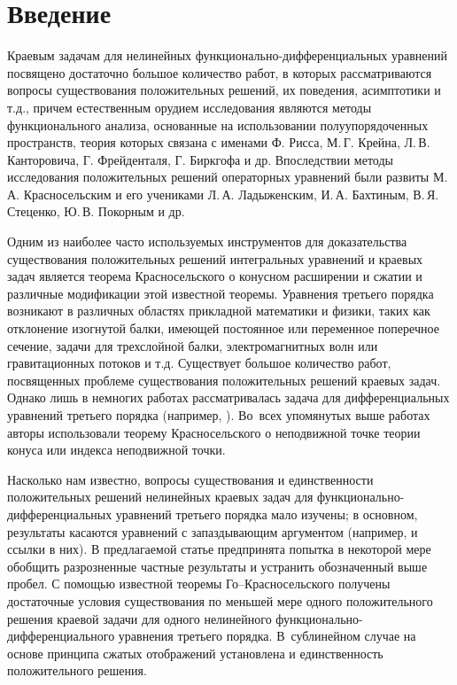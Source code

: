 \documentclass[press]{vestnik}
\begin{document}


\date{26-03-2024}

\maketitle

\section*{Введение}

Краевым задачам для нелинейных функционально-дифференциальных уравнений посвящено достаточно большое количество работ, в которых рассматриваются вопросы существования положительных решений, их поведения, асимптотики и т.д., причем естественным орудием исследования являются методы функционального анализа, основанные на использовании полуупорядоченных пространств, теория которых связана с именами Ф. Рисса, М.\,Г. Крейна, Л.\,В. Канторовича, Г. Фрейденталя, Г. Биркгофа и др. Впоследствии методы исследования положительных решений  операторных уравнений были развиты М.\,А. Красносельским и его учениками Л.\,А. Ладыженским, И.\,А. Бахтиным, В.\,Я. Стеценко, Ю.\,В. Покорным и др.

Одним из наиболее часто используемых инструментов для доказательства существования положительных решений интегральных уравнений и краевых задач является теорема Красносельского о конусном расширении и сжатии и различные модификации этой известной теоремы. Уравнения третьего порядка возникают в различных областях прикладной математики и физики, таких как отклонение изогнутой балки, имеющей постоянное или переменное поперечное сечение, задачи для трехслойной балки, электромагнитных волн или гравитационных потоков и т.д. Существует большое количество работ, посвященных проблеме существования положительных решений краевых задач. Однако лишь в немногих работах рассматривалась задача для дифференциальных уравнений третьего порядка (например, \cite{1,2,3,4,5,6,7,8}). Во~всех упомянутых выше работах авторы использовали теорему Красносельского о неподвижной точке теории конуса или индекса неподвижной точки.

Насколько нам известно, вопросы существования и единственности положительных решений нелинейных краевых задач для функционально-дифференциальных уравнений третьего порядка мало изучены; в основном, результаты касаются уравнений с запаздывающим аргументом (например, \cite{9,10} и ссылки в них). В предлагаемой статье предпринята попытка в некоторой мере обобщить разрозненные частные результаты и устранить обозначенный выше пробел. С помощью известной теоремы Го--Красносельского получены достаточные условия существования по меньшей мере одного положительного решения краевой задачи для одного нелинейного функционально-дифференциального уравнения третьего порядка. В~сублинейном случае на основе принципа сжатых отображений установлена и единственность положительного решения.
\end{document}
